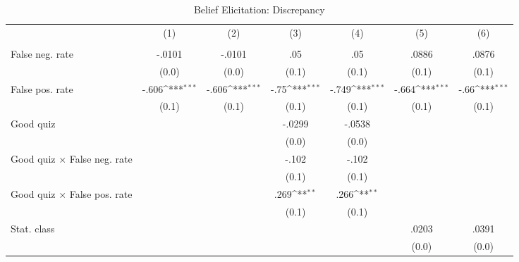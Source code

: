 \begin{table}[htbp]\centering
\def\sym#1{\ifmmode^{#1}\else\(^{#1}\)\fi}
\caption{Belief Elicitation: Discrepancy}
\begin{tabular}{l*{6}{c}}
\hline\hline
                &\multicolumn{1}{c}{(1)}&\multicolumn{1}{c}{(2)}&\multicolumn{1}{c}{(3)}&\multicolumn{1}{c}{(4)}&\multicolumn{1}{c}{(5)}&\multicolumn{1}{c}{(6)}\\
                &\multicolumn{1}{c}{}&\multicolumn{1}{c}{}&\multicolumn{1}{c}{}&\multicolumn{1}{c}{}&\multicolumn{1}{c}{}&\multicolumn{1}{c}{}\\
\hline
False neg. rate &   -.0101         &   -.0101         &      .05         &      .05         &    .0886         &    .0876         \\
                &    (0.0)         &    (0.0)         &    (0.1)         &    (0.1)         &    (0.1)         &    (0.1)         \\
False pos. rate &    -.606\sym{***}&    -.606\sym{***}&     -.75\sym{***}&    -.749\sym{***}&    -.664\sym{***}&     -.66\sym{***}\\
                &    (0.1)         &    (0.1)         &    (0.1)         &    (0.1)         &    (0.1)         &    (0.1)         \\
Good quiz       &                  &                  &   -.0299         &   -.0538         &                  &                  \\
                &                  &                  &    (0.0)         &    (0.0)         &                  &                  \\
Good quiz $\times$ False neg. rate&                  &                  &    -.102         &    -.102         &                  &                  \\
                &                  &                  &    (0.1)         &    (0.1)         &                  &                  \\
Good quiz $\times$ False pos. rate&                  &                  &     .269\sym{**} &     .266\sym{**} &                  &                  \\
                &                  &                  &    (0.1)         &    (0.1)         &                  &                  \\
Stat. class     &                  &                  &                  &                  &    .0203         &    .0391         \\
                &                  &                  &                  &                  &    (0.0)         &    (0.0)         \\

\end{tabular}
\end{table}
